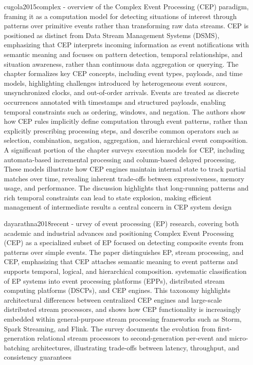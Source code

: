 cugola2015complex - overview of the Complex Event Processing (CEP) paradigm, framing it as a computation model for detecting situations of interest through patterns over primitive events rather than transforming raw data streams. CEP is positioned as distinct from Data Stream Management Systems (DSMS), emphasizing that CEP interprets incoming information as event notifications with semantic meaning and focuses on pattern detection, temporal relationships, and situation awareness, rather than continuous data aggregation or querying. The chapter formalizes key CEP concepts, including event types, payloads, and time models, highlighting challenges introduced by heterogeneous event sources, unsynchronized clocks, and out-of-order arrivals. Events are treated as discrete occurrences annotated with timestamps and structured payloads, enabling temporal constraints such as ordering, windows, and negation. The authors show how CEP rules implicitly define computation through event patterns, rather than explicitly prescribing processing steps, and describe common operators such as selection, combination, negation, aggregation, and hierarchical event composition. A significant portion of the chapter surveys execution models for CEP, including automata-based incremental processing and column-based delayed processing. These models illustrate how CEP engines maintain internal state to track partial matches over time, revealing inherent trade-offs between expressiveness, memory usage, and performance. The discussion highlights that long-running patterns and rich temporal constraints can lead to state explosion, making efficient management of intermediate results a central concern in CEP system design

dayarathna2018recent - urvey of event processing (EP) research, covering both academic and industrial advances and positioning Complex Event Processing (CEP) as a specialized subset of EP focused on detecting composite events from patterns over simple events. The paper distinguishes EP, stream processing, and CEP, emphasizing that CEP attaches semantic meaning to event patterns and supports temporal, logical, and hierarchical composition. systematic classification of EP systems into event processing platforms (EPPs), distributed stream computing platforms (DSCPs), and CEP engines. This taxonomy highlights architectural differences between centralized CEP engines and large-scale distributed stream processors, and shows how CEP functionality is increasingly embedded within general-purpose stream processing frameworks such as Storm, Spark Streaming, and Flink. The survey documents the evolution from first-generation relational stream processors to second-generation per-event and micro-batching architectures, illustrating trade-offs between latency, throughput, and consistency guarantees

